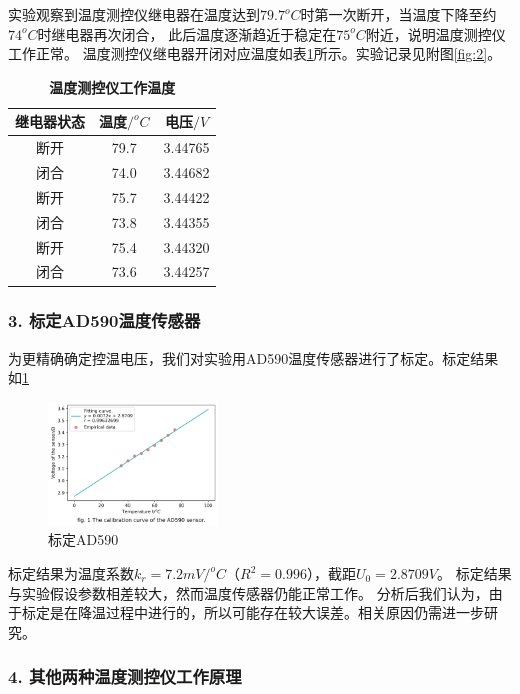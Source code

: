 \documentclass[12pt,a4paper,UTF8]{ctexart}
\begin{document}
    实验观察到温度测控仪继电器在温度达到$79.7^oC$时第一次断开，当温度下降至约$74^oC$时继电器再次闭合，
    此后温度逐渐趋近于稳定在$75^oC$附近，说明温度测控仪工作正常。
    温度测控仪继电器开闭对应温度如表\ref{tab:2}所示。实验记录见附图\ref{fig:2}。
    \begin{table}[htbp]
        \centering
            \begin{tabular}{ccc}
                \toprule
                继电器状态    &温度$/^oC$    &电压$/V$  \\
                \midrule
                $断开$   &79.7  &3.44765	\\
                $闭合$   &74.0  &3.44682	\\
                $断开$   &75.7	&3.44422	\\
                $闭合$   &73.8	&3.44355	\\
                $断开$   &75.4	&3.44320	\\
                $闭合$   &73.6	&3.44257	\\
                \bottomrule
            \end{tabular}
            \caption{\textbf{温度测控仪工作温度}}
            \label{tab:2}
    \end{table}
    \subsubsection{3. 标定AD590温度传感器}
    为更精确确定控温电压，我们对实验用AD590温度传感器进行了标定。标定结果如\ref{fig:1}
    \begin{figure}[htbp]
        \centering
        \includegraphics[width=0.4\textwidth]{attachments/fig.1.png}
        \caption{标定AD590}
        \label{fig:1}
    \end{figure}

    标定结果为温度系数$k_r = 7.2 mV/^oC$（$R^2 = 0.996$），截距$U_0 = 2.8709 V$。
    标定结果与实验假设参数相差较大，然而温度传感器仍能正常工作。
    分析后我们认为，由于标定是在降温过程中进行的，所以可能存在较大误差。相关原因仍需进一步研究。

    \subsubsection{4. 其他两种温度测控仪工作原理}
\end{document}

